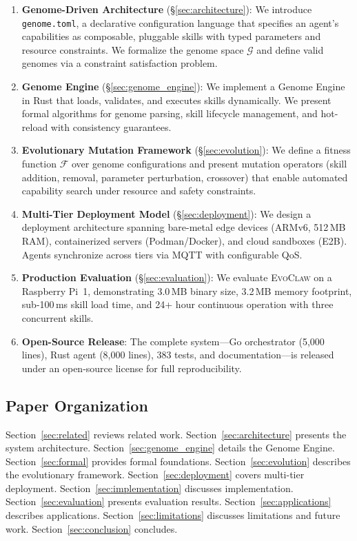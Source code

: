 \documentclass{article}
\newcommand{\evoclaw}{\textsc{EvoClaw}}
\newcommand{\genome}{\texttt{genome.toml}}
\newcommand{\fitnessfn}{\mathcal{F}}
\newcommand{\genomespace}{\mathcal{G}}
\begin{document}
\begin{enumerate}[leftmargin=*]
    \item \textbf{Genome-Driven Architecture} (\S\ref{sec:architecture}): We introduce \genome{}, a declarative configuration language that specifies an agent's capabilities as composable, pluggable skills with typed parameters and resource constraints. We formalize the genome space $\genomespace$ and define valid genomes via a constraint satisfaction problem.
    
    \item \textbf{Genome Engine} (\S\ref{sec:genome_engine}): We implement a Genome Engine in Rust that loads, validates, and executes skills dynamically. We present formal algorithms for genome parsing, skill lifecycle management, and hot-reload with consistency guarantees.
    
    \item \textbf{Evolutionary Mutation Framework} (\S\ref{sec:evolution}): We define a fitness function $\fitnessfn$ over genome configurations and present mutation operators (skill addition, removal, parameter perturbation, crossover) that enable automated capability search under resource and safety constraints.
    
    \item \textbf{Multi-Tier Deployment Model} (\S\ref{sec:deployment}): We design a deployment architecture spanning bare-metal edge devices (ARMv6, 512\,MB RAM), containerized servers (Podman/Docker), and cloud sandboxes (E2B). Agents synchronize across tiers via MQTT with configurable QoS.
    
    \item \textbf{Production Evaluation} (\S\ref{sec:evaluation}): We evaluate \evoclaw{} on a Raspberry Pi~1, demonstrating 3.0\,MB binary size, 3.2\,MB memory footprint, sub-100\,ms skill load time, and 24+ hour continuous operation with three concurrent skills.
    
    \item \textbf{Open-Source Release}: The complete system---Go orchestrator (5,000 lines), Rust agent (8,000 lines), 383 tests, and documentation---is released under an open-source license for full reproducibility.
\end{enumerate}


\subsection{Paper Organization}

Section~\ref{sec:related} reviews related work. Section~\ref{sec:architecture} presents the system architecture. Section~\ref{sec:genome_engine} details the Genome Engine. Section~\ref{sec:formal} provides formal foundations. Section~\ref{sec:evolution} describes the evolutionary framework. Section~\ref{sec:deployment} covers multi-tier deployment. Section~\ref{sec:implementation} discusses implementation. Section~\ref{sec:evaluation} presents evaluation results. Section~\ref{sec:applications} describes applications. Section~\ref{sec:limitations} discusses limitations and future work. Section~\ref{sec:conclusion} concludes.
\end{document}
